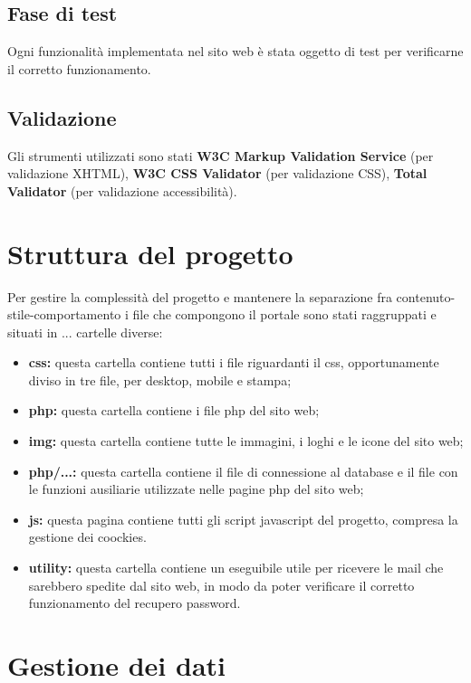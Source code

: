 \subsection{Fase di test}

Ogni funzionalità implementata nel sito web è stata oggetto di test per verificarne il corretto funzionamento.

\subsection{Validazione}

Gli strumenti utilizzati sono stati \textbf{W3C Markup Validation Service} (per validazione XHTML), \textbf{W3C CSS Validator} (per validazione CSS), \textbf{Total Validator} (per validazione accessibilità).

\section{Struttura del progetto}

Per gestire la complessità del progetto e mantenere la separazione fra contenuto-stile-comportamento i file che compongono il portale sono stati raggruppati e situati in ... cartelle diverse:

\begin{itemize}
	\item \textbf{css:} questa cartella contiene tutti i file riguardanti il css, opportunamente diviso in tre file, per desktop, mobile e stampa;
	\item \textbf{php:} questa cartella contiene i file php del sito web;
	\item \textbf{img:} questa cartella contiene tutte le immagini, i loghi e le icone del sito web;
	\item \textbf{php/...:} questa cartella contiene il file di connessione al database e il file con le funzioni ausiliarie utilizzate nelle pagine php del sito web;
	\item \textbf{js:} questa pagina contiene tutti gli script javascript del progetto, compresa la gestione dei coockies.
	\item \textbf{utility:} questa cartella contiene un eseguibile utile per ricevere le mail che sarebbero spedite dal sito web, in modo da poter verificare il corretto funzionamento del recupero password.
\end{itemize}

\section{Gestione dei dati}

